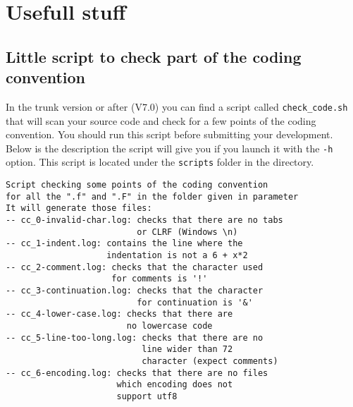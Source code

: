 %
\chapter{Usefull stuff}
%
\section{Little script to check part of the coding convention}
%
In the trunk version or after (V7.0) you can find a script called
\verb!check_code.sh! that will scan your source code and check for a few points
of the coding convention. You should run this script before submitting your
development. Below is the description the script will give you if you launch it
with the \verb!-h! option. This script is located under the \verb!scripts!
folder in the \telemacsystem directory.
\begin{lstlisting}
Script checking some points of the coding convention
for all the ".f" and ".F" in the folder given in parameter
It will generate those files:
-- cc_0-invalid-char.log: checks that there are no tabs
                          or CLRF (Windows \n)
-- cc_1-indent.log: contains the line where the
                    indentation is not a 6 + x*2
-- cc_2-comment.log: checks that the character used
                     for comments is '!'
-- cc_3-continuation.log: checks that the character
                          for continuation is '&'
-- cc_4-lower-case.log: checks that there are
                        no lowercase code
-- cc_5-line-too-long.log: checks that there are no
                           line wider than 72
                           character (expect comments)
-- cc_6-encoding.log: checks that there are no files
                      which encoding does not
                      support utf8
\end{lstlisting}

